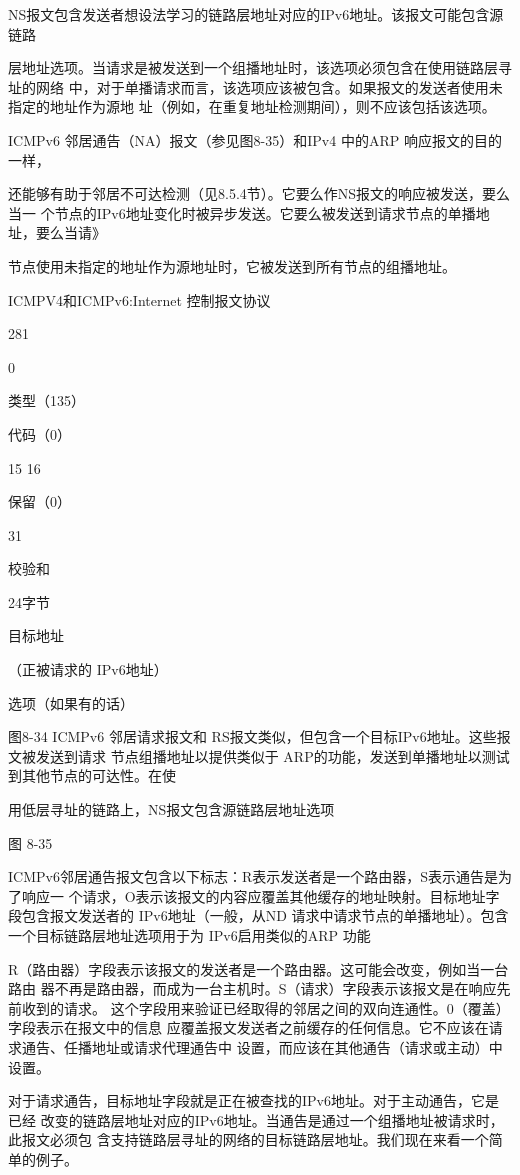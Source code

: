 NS报文包含发送者想设法学习的链路层地址对应的IPv6地址。该报文可能包含源链路

层地址选项。当请求是被发送到一个组播地址时，该选项必须包含在使用链路层寻址的网络
中，对于单播请求而言，该选项应该被包含。如果报文的发送者使用未指定的地址作为源地
址（例如，在重复地址检测期间），则不应该包括该选项。

ICMPv6 邻居通告（NA）报文（参见图8-35）和IPv4 中的ARP 响应报文的目的一样，

还能够有助于邻居不可达检测（见8.5.4节）。它要么作NS报文的响应被发送，要么当一
个节点的IPv6地址变化时被异步发送。它要么被发送到请求节点的单播地址，要么当请》

节点使用未指定的地址作为源地址时，它被发送到所有节点的组播地址。

ICMPV4和ICMPv6:Internet 控制报文协议

281

0

类型（135）

代码（0）

15 16

保留（0）

31

校验和

24字节

目标地址

（正被请求的 IPv6地址）

选项（如果有的话）

图8-34 ICMPv6 邻居请求报文和 RS报文类似，但包含一个目标IPv6地址。这些报文被发送到请求
节点组播地址以提供类似于 ARP的功能，发送到单播地址以测试到其他节点的可达性。在使

用低层寻址的链路上，NS报文包含源链路层地址选项


图 8-35

ICMPv6邻居通告报文包含以下标志：R表示发送者是一个路由器，S表示通告是为了响应一
个请求，O表示该报文的内容应覆盖其他缓存的地址映射。目标地址字段包含报文发送者的
IPv6地址（一般，从ND 请求中请求节点的单播地址）。包含一个目标链路层地址选项用于为
IPv6启用类似的ARP 功能

R（路由器）字段表示该报文的发送者是一个路由器。这可能会改变，例如当一台路由
器不再是路由器，而成为一台主机时。S（请求）字段表示该报文是在响应先前收到的请求。
这个字段用来验证已经取得的邻居之间的双向连通性。0（覆盖）字段表示在报文中的信息
应覆盖报文发送者之前缓存的任何信息。它不应该在请求通告、任播地址或请求代理通告中
设置，而应该在其他通告（请求或主动）中设置。

对于请求通告，目标地址字段就是正在被查找的IPv6地址。对于主动通告，它是已经
改变的链路层地址对应的IPv6地址。当通告是通过一个组播地址被请求时，此报文必须包
含支持链路层寻址的网络的目标链路层地址。我们现在来看一个简单的例子。

